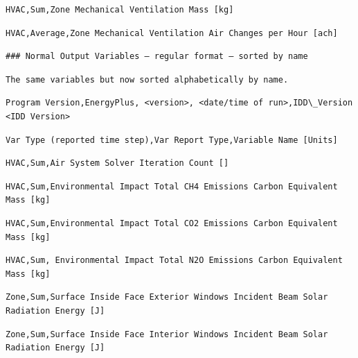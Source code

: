 \begin{lstlisting}
HVAC,Sum,Zone Mechanical Ventilation Mass [kg]
\end{lstlisting}

\begin{lstlisting}
HVAC,Average,Zone Mechanical Ventilation Air Changes per Hour [ach]
\end{lstlisting}

\begin{lstlisting}
### Normal Output Variables – regular format – sorted by name
\end{lstlisting}

\begin{lstlisting}
The same variables but now sorted alphabetically by name.
\end{lstlisting}

\begin{lstlisting}
Program Version,EnergyPlus, <version>, <date/time of run>,IDD\_Version <IDD Version>
\end{lstlisting}

\begin{lstlisting}
Var Type (reported time step),Var Report Type,Variable Name [Units]
\end{lstlisting}

\begin{lstlisting}
HVAC,Sum,Air System Solver Iteration Count []
\end{lstlisting}

\begin{lstlisting}
HVAC,Sum,Environmental Impact Total CH4 Emissions Carbon Equivalent Mass [kg]
\end{lstlisting}

\begin{lstlisting}
HVAC,Sum,Environmental Impact Total CO2 Emissions Carbon Equivalent Mass [kg]
\end{lstlisting}

\begin{lstlisting}
HVAC,Sum, Environmental Impact Total N2O Emissions Carbon Equivalent Mass [kg]
\end{lstlisting}

\begin{lstlisting}
Zone,Sum,Surface Inside Face Exterior Windows Incident Beam Solar Radiation Energy [J]
\end{lstlisting}

\begin{lstlisting}
Zone,Sum,Surface Inside Face Interior Windows Incident Beam Solar Radiation Energy [J]
\end{lstlisting}

